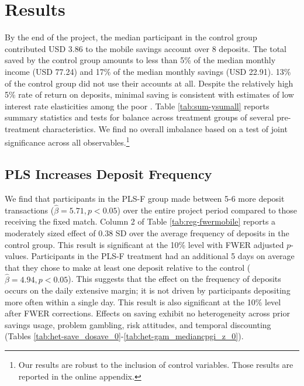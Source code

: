 \documentclass[12pt]{article}
\begin{document}
\section{Results} \label{sec:results}

	By the end of the project, the median participant in the control group contributed USD 3.86 to the mobile savings account over 8 deposits. The total saved by the control group amounts to less than 5\% of the median monthly income (USD 77.24) and 17\% of the median monthly savings (USD 22.91). 13\% of the control group did not use their accounts at all. Despite the relatively high 5\% rate of return on deposits, minimal saving is consistent with estimates of low interest rate elasticities among the poor \parencite{karlan_price_2018}. Table \ref{tab:sum-ysumall} reports summary statistics and tests for balance across treatment groups of several pre-treatment characteristics. We find no overall imbalance based on a test of joint significance across all observables.\footnote{Our results are robust to the inclusion of control variables. Those results are reported in the online appendix.}


	

	\subsection{PLS Increases Deposit Frequency}

		We find that participants in the PLS-F group made between 5-6 more deposit transactions ($\hat \beta = 5.71, p < 0.05$) over the entire project period compared to those receiving the fixed match. Column 2 of Table \ref{tab:reg-fwermobile} reports a moderately sized effect of 0.38 SD over the average frequency of deposits in the control group. This result is significant at the 10\% level with FWER adjusted $p$-values. Participants in the PLS-F treatment had an additional 5 days on average that they chose to make at least one deposit relative to the control ($\hat \beta = 4.94, p < 0.05$). This suggests that the effect on the frequency of deposits occurs on the daily extensive margin; it is not driven by participants depositing more often within a single day. This result is also significant at the 10\% level after FWER corrections. Effects on saving exhibit no heterogeneity across prior savings usage, problem gambling, risk attitudes, and temporal discounting (Tables \ref{tab:het-save_dosave_0}-\ref{tab:het-gam_mediancpgi_z_0}).
\end{document}
